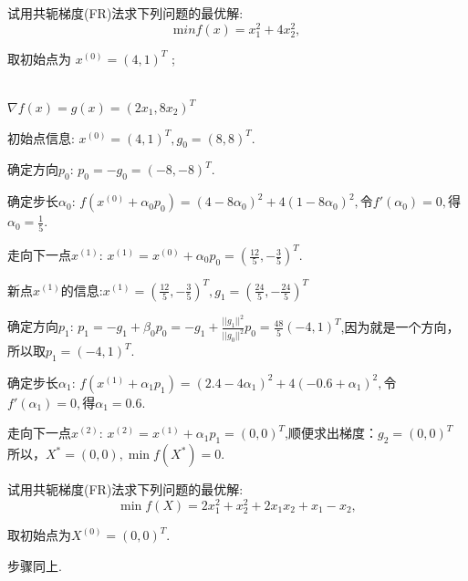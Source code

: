 \documentclass[cn]{elegantbook}
\begin{document}
\begin{exercisez}
试用共轭梯度(FR)法求下列问题的最优解:
$$ \mathrm{m}  in  f(x)=x_{1}^{2}+4 x_{2}^{2} ,$$

取初始点为  $x^{(0)}=(4,1)^{T}$ ;
\end{exercisez}
\begin{solution}\\
$\nabla f(x)=g(x)=\left(2 x_{1}, 8 x_{2}\right)^{T}$
\vspace{10pt}

 \textcolor[rgb]{1.00,0.00,0.00}{\large 初始点信息:}
 $ x^{(0)}=(4,1)^{T}, g_{0}=(8,8)^T.$
 \vspace{6pt}

 \textcolor[rgb]{1.00,0.00,0.00}{\large 确定方向$p_0$:}
 $ p_0=-g_{0}=(-8,-8)^T.$
  \vspace{6pt}

 \textcolor[rgb]{1.00,0.00,0.00}{\large 确定步长$\alpha_0$:}
 $ f(x^{(0)}+\alpha_0p_0)=(4-8\alpha_0)^2+4(1-8\alpha_0)^2,$令$f'(\alpha_0)=0,$得$\alpha_0=\frac{1}{5}$.
  \vspace{6pt}

 \textcolor[rgb]{1.00,0.00,0.00}{\large 走向下一点$x^{(1)}$:}
 $ x^{(1)}=x^{(0)}+\alpha_0p_0=(\frac{12}{5},-\frac{3}{5})^T.$
 \vspace{30pt}

 \textcolor[rgb]{0.00,0.50,1.00}{\large 新点$x^{(1)}$的信息:}$x^{(1)}=(\frac{12}{5},-\frac{3}{5})^T,g_{1}=(\frac{24}{5},-\frac{24}{5})^T$
 \vspace{6pt}

 \textcolor[rgb]{0.00,0.50,1.00}{\large 确定方向$p_1$:}
 $ p_1=-g_1+\beta_0p_0=-g_1+\frac{||g_1||^2}{||g_0||^2} p_0=\frac{48}{5}(-4,1)^T$,因为就是一个方向，所以取$p_1=(-4,1)^T$.
  \vspace{6pt}

 \textcolor[rgb]{0.00,0.50,1.00}{\large 确定步长$\alpha_1$:}
 $ f(x^{(1)}+\alpha_1p_1)=\left(2.4-4 \alpha_{1}\right)^{2}+4\left(-0.6+\alpha_{1}\right)^{2},$令$f'(\alpha_1)=0,$得$\alpha_1=0.6$.
  \vspace{6pt}

\textcolor[rgb]{0.00,0.50,1.00}{\large 走向下一点$x^{(2)}$:}
 $ x^{(2)}=x^{(1)}+\alpha_1p_1=(0,0)^T$,顺便求出梯度：$g_2=(0,0)^T$\\
 所以，$X^{*}=(0,0), \min f\left(X^{*}\right)=0.$


\end{solution}

\begin{exercisez}
试用共轭梯度(FR)法求下列问题的最优解:
 $$\min f(X)=2 x_{1}^{2}+x_{2}^{2}+2 x_{1} x_{2}+x_{1}-x_{2} ,$$

 $ \text{取初始点为}  X^{(0)}=(0,0)^{T} .$

\end{exercisez}
\begin{solution}
步骤同上.
\end{solution}
\end{document}
